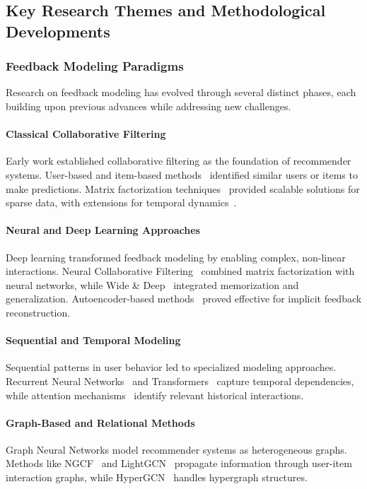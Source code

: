 \subsection{Key Research Themes and Methodological Developments}

\subsubsection{Feedback Modeling Paradigms}

Research on feedback modeling has evolved through several distinct phases, each building upon previous advances while addressing new challenges.

\paragraph{Classical Collaborative Filtering}
Early work established collaborative filtering as the foundation of recommender systems. User-based and item-based methods~\cite{sarwar2001item, breese1998empirical} identified similar users or items to make predictions. Matrix factorization techniques~\cite{koren2009matrix} provided scalable solutions for sparse data, with extensions for temporal dynamics~\cite{koren2010collaborative}.

\paragraph{Neural and Deep Learning Approaches}
Deep learning transformed feedback modeling by enabling complex, non-linear interactions. Neural Collaborative Filtering~\cite{he2017neural} combined matrix factorization with neural networks, while Wide \& Deep~\cite{cheng2016wide} integrated memorization and generalization. Autoencoder-based methods~\cite{sedhain2015autorec} proved effective for implicit feedback reconstruction.

\paragraph{Sequential and Temporal Modeling}
Sequential patterns in user behavior led to specialized modeling approaches. Recurrent Neural Networks~\cite{hidasi2015session} and Transformers~\cite{kang2018self, sun2019bert4rec} capture temporal dependencies, while attention mechanisms~\cite{kang2018self} identify relevant historical interactions.

\paragraph{Graph-Based and Relational Methods}
Graph Neural Networks model recommender systems as heterogeneous graphs. Methods like NGCF~\cite{wang2019neural} and LightGCN~\cite{he2020lightgcn} propagate information through user-item interaction graphs, while HyperGCN~\cite{hypergcn} handles hypergraph structures.

